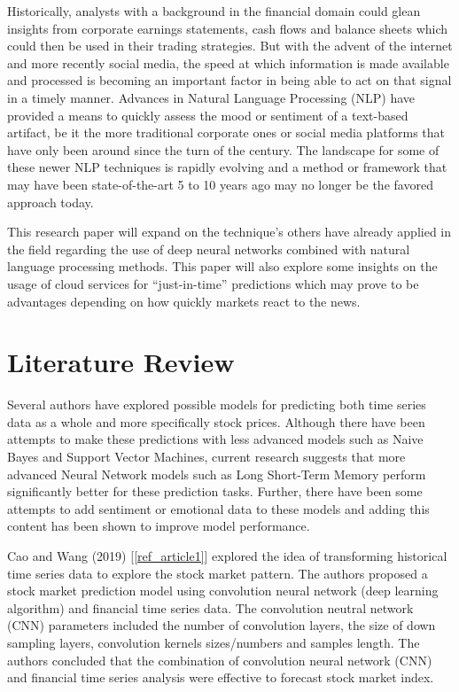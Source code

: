 \documentclass{llncs}
\begin{document}
Historically, analysts with a background in the financial domain could glean insights from corporate earnings statements, cash flows and balance sheets which could then be used in their trading strategies.  But with the advent of the internet and more recently social media, the speed at which information is made available and processed is becoming an important factor in being able to act on that signal in a timely manner.  Advances in Natural Language Processing (NLP) have provided a means to quickly assess the mood or sentiment of a text-based artifact, be it the more traditional corporate ones or social media platforms that have only been around since the turn of the century.  The landscape for some of these newer NLP techniques is rapidly evolving and a method or framework that may have been state-of-the-art 5 to 10 years ago may no longer be the favored approach today.

This research paper will expand on the technique's others have already applied in the field regarding the use of deep neural networks combined with natural language processing methods. This paper will also explore some insights on the usage of cloud services for “just-in-time” predictions which may prove to be advantages depending on how quickly markets react to the news.

\section{Literature Review}

Several authors have explored possible models for predicting both time series data as a whole and more specifically stock prices. Although there have been attempts to make these predictions with less advanced models such as Naive Bayes and Support Vector Machines, current research suggests that more advanced Neural Network models such as Long Short-Term Memory perform significantly better for these prediction tasks. Further, there have been some attempts to add sentiment or emotional data to these models and adding this content has been shown to improve model performance.

Cao and Wang (2019) [\ref{ref_article1}] explored the idea of transforming historical time series data to explore the stock market pattern. The authors proposed a stock market prediction model using convolution neural network (deep learning algorithm) and financial time series data. The convolution neutral network (CNN) parameters included the number of convolution layers, the size of down sampling layers, convolution kernels sizes/numbers and samples length. The authors concluded that the combination of convolution neural network (CNN) and financial time series analysis were effective to forecast stock market index.
\end{document}
